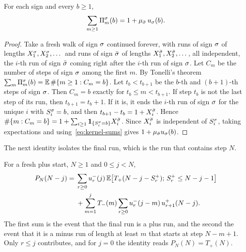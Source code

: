 \begin{lemma}\label{lem:green}
For each sign and every $b\ge1$,
\[
 \sum_{m\ge1}\Pi^\sigma_m(b)=1+\mu_{\bar\sigma}\,u_\sigma(b).
\]
\end{lemma}

\begin{proof}
Take a fresh walk of sign $\sigma$ continued forever, with runs of sign $\sigma$ of lengths
$X^\sigma_1,X^\sigma_2,\dots$ and runs of sign $\bar\sigma$ of lengths $X^{\bar\sigma}_1,X^{\bar\sigma}_2,\dots$,
all independent, the $i$-th run of sign $\bar\sigma$ coming right after the $i$-th run of
sign $\sigma$. Let $C_m$ be the number of steps of sign $\sigma$ among the first $m$. By
Tonelli's theorem $\sum_m\Pi^\sigma_m(b)=\mathbb{E}\,\#\{m\ge1:C_m=b\}$. Let $t_b<t_{b+1}$ be the
$b$-th and $(b+1)$-th steps of sign $\sigma$. Then $C_m=b$ exactly for $t_b\le m<t_{b+1}$.
If step $t_b$ is not the last step of its run, then $t_{b+1}=t_b+1$. If it is, it ends
the $i$-th run of sign $\sigma$ for the unique $i$ with $S^\sigma_i=b$, and then
$t_{b+1}-t_b=1+X^{\bar\sigma}_i$. Hence
$\#\{m:C_m=b\}=1+\sum_{i\ge1}\mathbf{1}_{\{S^\sigma_i=b\}}X^{\bar\sigma}_i$. Since $X^{\bar\sigma}_i$ is
independent of $S^\sigma_i$, taking expectations and using~\eqref{eq:kernel-sums} gives
$1+\mu_{\bar\sigma}u_\sigma(b)$.
\end{proof}

The next identity isolates the final run, which is the run that contains step $N$.

\begin{proposition}\label{prop:final-run}
For a fresh plus start, $N\ge1$ and $0\le j<N$,
\begin{equation}\label{eq:final-explicit}
\begin{split}
 P_N(N-j)={}&\sum_{r\ge0}u^{-}_r(j)\,\mathbb{E}\bigl[T_{+}(N-j-S^{+}_r);\,S^{+}_r\le N-j-1\bigr]\\
 &+\sum_{m=1}^{j}T_{-}(m)\sum_{r\ge0}u^{-}_r(j-m)\,u^{+}_{r+1}(N-j).
\end{split}
\end{equation}
The first sum is the event that the final run is a plus run, and the second the
event that it is a minus run of length at least $m$ that starts at step $N-m+1$. Only
$r\le j$ contributes, and for $j=0$ the identity reads $P_N(N)=T_\plus(N)$.
\end{proposition}

